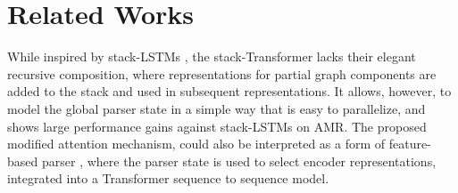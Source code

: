 \documentclass[11pt,a4paper]{article}
\begin{document}
\begin{table}[!t]
\centering
{}
\caption{Test-set performance for Table~\ref{table:dev} selections and prior art on the AMR1.0 and AMR2.0 in terms of Smatch.}
\label{table:amr-test}
\end{table}



\section{Related Works}
\label{section:related}

While inspired by stack-LSTMs \cite{dyer2015transition}, the stack-Transformer lacks their elegant recursive composition, where representations for partial graph components are added to the stack and used in subsequent representations. It allows, however, to model the global parser state in a simple way that is easy to parallelize, and shows large performance gains against stack-LSTMs on AMR. The proposed modified attention mechanism, could also be interpreted as a form of feature-based parser \cite{kiperwasser-goldberg-2016-simple}, where the parser state is used to select encoder representations, integrated into a Transformer sequence to sequence model.
\end{document}
